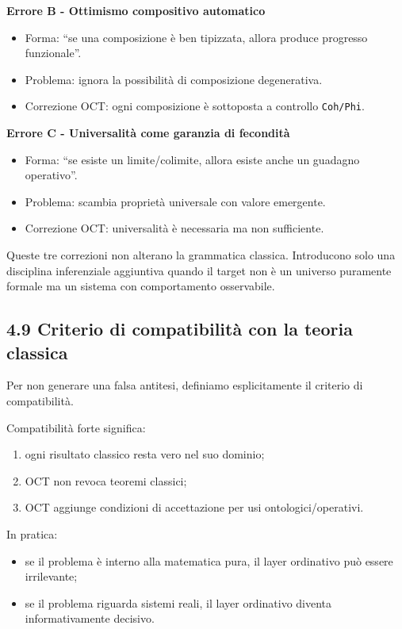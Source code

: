 \textbf{Errore B - Ottimismo compositivo automatico}

\begin{itemize}
\tightlist
\item
  Forma: ``se una composizione è ben tipizzata, allora produce progresso funzionale''.
\item
  Problema: ignora la possibilità di composizione degenerativa.
\item
  Correzione OCT: ogni composizione è sottoposta a controllo \texttt{Coh/Phi}.
\end{itemize}

\textbf{Errore C - Universalità come garanzia di fecondità}

\begin{itemize}
\tightlist
\item
  Forma: ``se esiste un limite/colimite, allora esiste anche un guadagno operativo''.
\item
  Problema: scambia proprietà universale con valore emergente.
\item
  Correzione OCT: universalità è necessaria ma non sufficiente.
\end{itemize}

Queste tre correzioni non alterano la grammatica classica. Introducono solo una disciplina inferenziale aggiuntiva quando il target non è un universo puramente formale ma un sistema con comportamento osservabile.

\subsection{4.9 Criterio di compatibilità con la teoria classica}

Per non generare una falsa antitesi, definiamo esplicitamente il criterio di compatibilità.

Compatibilità forte significa:

\begin{enumerate}
\def\labelenumi{\arabic{enumi}.}
\tightlist
\item
  ogni risultato classico resta vero nel suo dominio;
\item
  OCT non revoca teoremi classici;
\item
  OCT aggiunge condizioni di accettazione per usi ontologici/operativi.
\end{enumerate}

In pratica:

\begin{itemize}
\tightlist
\item
  se il problema è interno alla matematica pura, il layer ordinativo può essere irrilevante;
\item
  se il problema riguarda sistemi reali, il layer ordinativo diventa informativamente decisivo.
\end{itemize}

